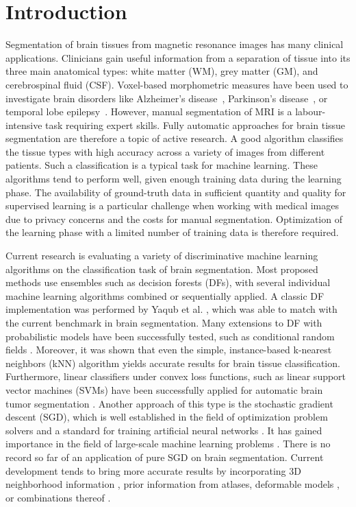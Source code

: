 \documentclass[journal]{IEEEtran}
\begin{document}
\section{Introduction}\label{s.introduction}
Segmentation of brain tissues from magnetic resonance images has many clinical applications. Clinicians gain useful information from a separation of tissue into its three main anatomical types: white matter (WM), grey matter (GM), and cerebrospinal fluid (CSF). Voxel-based morphometric measures have been used to investigate brain disorders like Alzheimer’s disease~\cite{busatto2003voxel}, Parkinson's disease~\cite{price2004voxel}, or temporal lobe epilepsy~\cite{rummel2017personalized}. However, manual segmentation of MRI is a labour-intensive task requiring expert skills. Fully automatic approaches for brain tissue segmentation are therefore a topic of active research. A good algorithm classifies the tissue types with high accuracy across a variety of images from different patients. Such a classification is a typical task for machine learning. These algorithms tend to perform well, given enough training data during the learning phase. The availability of ground-truth data in sufficient quantity and quality for supervised learning is a particular challenge when working with medical images due to privacy concerns and the costs for manual segmentation. Optimization of the learning phase with a limited number of training data is therefore required.

Current research is evaluating a variety of discriminative machine learning algorithms on the classification task of brain segmentation. Most proposed methods use ensembles such as decision forests (DFs), with several individual machine learning algorithms combined or sequentially applied. A classic DF implementation was performed by Yaqub et al. \cite{Yaqub2014}, which was able to match with the current benchmark in brain segmentation. Many extensions to DF with probabilistic models have been successfully tested, such as conditional random fields \cite{Pereira2016}. Moreover, it was shown that even the simple, instance-based k-nearest neighbors (kNN) algorithm yields accurate results \cite{Anbeek2004,Cocosco2003,Warfield2000} for brain tissue classification. Furthermore, linear classifiers under convex loss functions, such as linear support vector machines (SVMs) have been successfully applied for automatic brain tumor segmentation \cite{Bauer2011}. Another approach of this type is the stochastic gradient descent (SGD), which is well established in the field of optimization problem solvers and a standard for training artificial neural networks \cite{LeCun1998}. It has gained importance in the field of large-scale machine learning problems \cite{Bottou2010}. There is no record so far of an application of pure SGD on brain segmentation. Current development tends to bring more accurate results by incorporating 3D neighborhood information \cite{Li2011,Despotovic2013}, prior information from atlases\cite{Pohl2006,Ashburner2005}, deformable models \cite{Moreno2014}, or combinations thereof \cite{Ortiz2014}.
\end{document}
